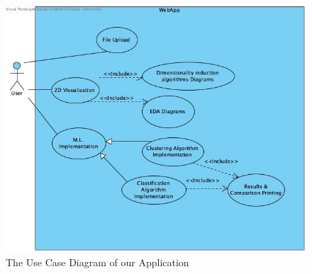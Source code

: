 \documentclass[unnumsec,webpdf,contemporary,large]{oup-authoring-template}%
\theoremstyle{thmstyleone}%
\theoremstyle{thmstyletwo}%
\theoremstyle{thmstylethree}%
\begin{document}
\begin{figure}
    \centering
    \includegraphics[width=1\linewidth]{Use Case Diagram.jpg}
    \caption{The Use Case Diagram of our Application}
    \label{fig:use-case-diagram}
\end{figure}
\end{document}

